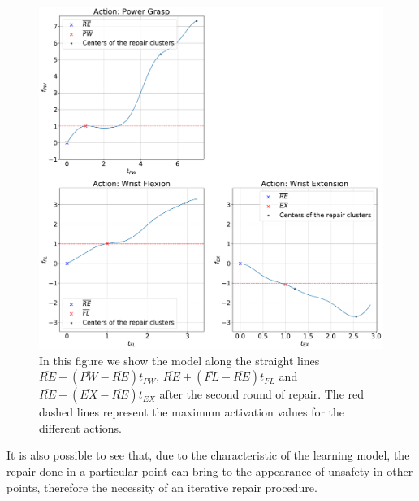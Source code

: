 \begin{figure}[ht]
    \centering
    \includegraphics[width=\textwidth]{Images/repair-example/PDO-State2.pdf}
    \caption{In this figure we show the model along the straight lines $\overline{RE} + (\overline{PW} - \overline{RE})t_{PW}$, $\overline{RE} + (\overline{FL} - \overline{RE})t_{FL}$ and $\overline{RE} + (\overline{EX} - \overline{RE})t_{EX}$ after the second round of repair. The red dashed lines represent the maximum activation values for the different actions.}
    \label{fig:PDO-exec-2}
\end{figure}
It is also possible to see that, due to the characteristic of the learning model, the repair done in a particular point can bring to the appearance of unsafety in other points, therefore the necessity of an iterative repair procedure.
